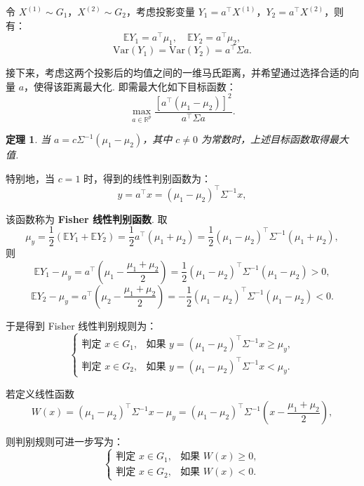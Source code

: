 \documentclass[12pt, a4paper, oneside]{ctexart}
\newtheorem{theorem}{定理}[section]
\begin{document}
	令 \(X^{(1)} \sim G_1\)，\(X^{(2)} \sim G_2\)，考虑投影变量 \(Y_1 = a^\top X^{(1)}\)，\(Y_2 = a^\top X^{(2)}\)，则有：
	\[
	\mathbb{E}Y_1 = a^\top \mu_1, \quad \mathbb{E}Y_2 = a^\top \mu_2,
	\]
	\[
	\mathrm{Var}(Y_1) = \mathrm{Var}(Y_2) = a^\top \Sigma a.
	\]
	
	接下来，考虑这两个投影后的均值之间的一维马氏距离，并希望通过选择合适的向量 \(a\)，使得该距离最大化. 即需最大化如下目标函数：
	\begin{equation}
		\max_{a \in \mathbb{R}^p} \frac{\left[ a^\top (\mu_1 - \mu_2) \right]^2}{a^\top \Sigma a}.
	\end{equation}
	
	\begin{theorem}
		当 \(a = c \Sigma^{-1} (\mu_1 - \mu_2)\)，其中 \(c \neq 0\) 为常数时，上述目标函数取得最大值.
	\end{theorem}
	特别地，当 \(c = 1\) 时，得到的线性判别函数为：
	\begin{equation}
		y = a^\top x = (\mu_1 - \mu_2)^\top \Sigma^{-1} x,
	\end{equation}
	
	该函数称为 \textbf{Fisher 线性判别函数}.
	取
	\[
	\mu_y = \frac{1}{2}(\mathbb{E}Y_1 + \mathbb{E}Y_2) = \frac{1}{2} a^\top (\mu_1 + \mu_2) = \frac{1}{2} (\mu_1 - \mu_2)^\top \Sigma^{-1} (\mu_1 + \mu_2),
	\]
	则
	\[
	\mathbb{E}Y_1 - \mu_y = a^\top \left( \mu_1 - \frac{\mu_1 + \mu_2}{2} \right) = \frac{1}{2} (\mu_1 - \mu_2)^\top \Sigma^{-1} (\mu_1 - \mu_2) > 0,
	\]
	\[
	\mathbb{E}Y_2 - \mu_y = a^\top \left( \mu_2 - \frac{\mu_1 + \mu_2}{2} \right) = -\frac{1}{2} (\mu_1 - \mu_2)^\top \Sigma^{-1} (\mu_1 - \mu_2) < 0.
	\]
	
	于是得到 Fisher 线性判别规则为：
	\[
	\begin{cases}
		\text{判定 } x \in G_1, & \text{如果 } y = (\mu_1 - \mu_2)^\top \Sigma^{-1} x \geq \mu_y, \\
		\text{判定 } x \in G_2, & \text{如果 } y = (\mu_1 - \mu_2)^\top \Sigma^{-1} x < \mu_y.
	\end{cases}
	\]
	
	若定义线性函数
	\begin{equation}
		W(x) = (\mu_1 - \mu_2)^\top \Sigma^{-1} x - \mu_y = (\mu_1 - \mu_2)^\top \Sigma^{-1} \left( x - \frac{\mu_1 + \mu_2}{2} \right),
	\end{equation}
	
	
	则判别规则可进一步写为：
	\[
	\begin{cases}
		\text{判定 } x \in G_1, & \text{如果 } W(x) \geq 0, \\
		\text{判定 } x \in G_2, & \text{如果 } W(x) < 0.
	\end{cases}
	\]
	
\end{document}
